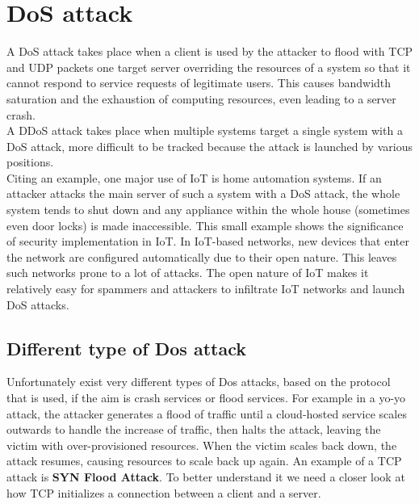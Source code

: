 \section{DoS attack}

A DoS attack takes place when a client is used by the attacker to flood with TCP and UDP packets one target server overriding the resources of a system so that it cannot respond to service requests of legitimate users. This causes bandwidth saturation and the exhaustion of computing resources, even leading to a server crash.\\
A DDoS attack takes place when multiple systems target a single system with a DoS attack, more difficult to be tracked because the attack is launched by various positions.\\
Citing an example, one major use of IoT is home automation
systems. If an attacker attacks the main server of such a
system with a DoS attack, the whole system tends to shut
down and any appliance within the whole house (sometimes
even door locks) is made inaccessible. This small example
shows the significance of security implementation in IoT.
In IoT-based networks, new devices that enter the
network are configured automatically due to their open nature.
This leaves such networks prone to a lot of attacks. The open
nature of IoT makes it relatively easy for spammers and
attackers to infiltrate IoT networks and launch DoS attacks.

\subsection{Different type of Dos attack}
Unfortunately exist very different types of Dos attacks, based on the protocol that is used, if the aim is crash services or flood services. For example in a yo-yo attack, the attacker generates a flood of traffic until a cloud-hosted service scales outwards to handle the increase of traffic, then halts the attack, leaving the victim with over-provisioned resources. When the victim scales back down, the attack resumes, causing resources to scale back up again.
An example of a TCP attack is \textbf{SYN Flood Attack}. To better understand it we need a closer look at how TCP initializes a connection between a client and a server.

